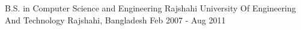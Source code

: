 

\begin{cventries}

  \cventry
    {B.S. in Computer Science and Engineering} %
    {Rajshahi University Of Engineering And Technology} %
    {Rajshahi, Bangladesh} %
    {Feb 2007 - Aug 2011} %
    {
    }

\end{cventries}
